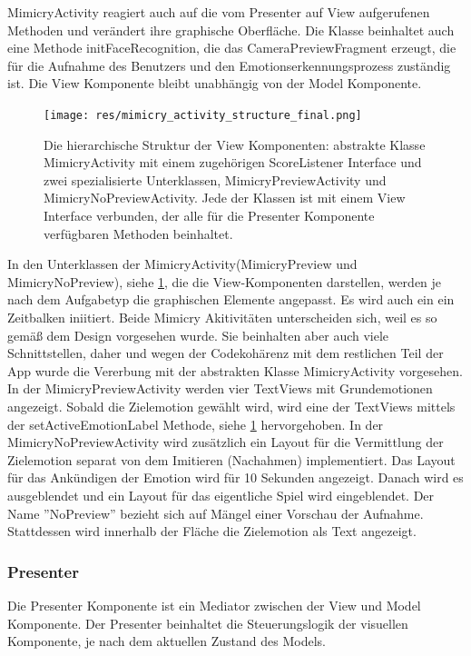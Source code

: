 MimicryActivity reagiert auch auf die vom Presenter auf View aufgerufenen Methoden und verändert ihre graphische Oberfläche. Die Klasse beinhaltet auch eine Methode initFaceRecognition, die das CameraPreviewFragment erzeugt, die für die Aufnahme des Benutzers und den Emotionserkennungsprozess zuständig ist. Die View Komponente bleibt unabhängig von der Model Komponente.
\begin{figure}[!ht]
    \centering\texttt{[image: res/mimicry\_activity\_structure\_final.png]}
\caption{Die hierarchische Struktur der View Komponenten: abstrakte Klasse MimicryActivity mit einem zugehörigen ScoreListener Interface und zwei spezialisierte Unterklassen, MimicryPreviewActivity und MimicryNoPreviewActivity. Jede der Klassen ist mit einem View Interface verbunden, der alle für die Presenter Komponente verfügbaren Methoden beinhaltet. }
\label{mimicrystructure}
\end{figure}

In den Unterklassen der MimicryActivity(MimicryPreview und MimicryNoPreview), siehe \ref{mimicrystructure}, die die View-Komponenten darstellen, werden je nach dem Aufgabetyp die graphischen Elemente angepasst. Es wird auch ein ein Zeitbalken iniitiert. Beide Mimicry Akitivitäten unterscheiden sich, weil es so gemäß dem Design vorgesehen wurde. Sie beinhalten aber auch viele Schnittstellen, daher und wegen der Codekohärenz mit dem restlichen Teil der App wurde die Vererbung mit der abstrakten Klasse MimicryActivity vorgesehen.
In der MimicryPreviewActivity werden vier TextViews mit Grundemotionen angezeigt. Sobald die Zielemotion gewählt wird, wird eine der TextViews mittels der setActiveEmotionLabel Methode, siehe \ref{mimicrystructure} hervorgehoben.
In der MimicryNoPreviewActivity wird zusätzlich ein Layout für die Vermittlung der Zielemotion separat von dem Imitieren (Nachahmen) implementiert. Das Layout für das Ankündigen der Emotion wird für 10 Sekunden angezeigt. Danach wird es ausgeblendet und ein Layout für das eigentliche Spiel wird eingeblendet. Der Name ''NoPreview'' bezieht sich auf Mängel einer Vorschau der Aufnahme. Stattdessen wird innerhalb der Fläche die Zielemotion als Text angezeigt. 
\newpage
\subsubsection{Presenter}
Die Presenter Komponente ist ein Mediator zwischen der View und Model Komponente. Der Presenter beinhaltet die Steuerungslogik der visuellen Komponente, je nach dem aktuellen Zustand des Models.

